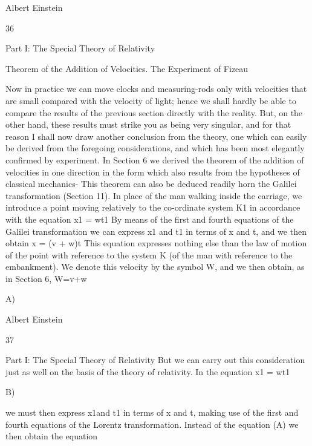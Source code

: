 \documentclass{article}
\begin{document}
Albert Einstein

36

Part I: The Special Theory of Relativity

Theorem of the Addition of
Velocities.
The Experiment of Fizeau

Now in practice we can move clocks and measuring-rods only with velocities that are
small compared with the velocity of light; hence we shall hardly be able to compare the
results of the previous section directly with the reality. But, on the other hand, these results
must strike you as being very singular, and for that reason I shall now draw another
conclusion from the theory, one which can easily be derived from the foregoing
considerations, and which has been most elegantly confirmed by experiment.
In Section 6 we derived the theorem of the addition of velocities in one direction in the
form which also results from the hypotheses of classical mechanics- This theorem can also
be deduced readily horn the Galilei transformation (Section 11). In place of the man
walking inside the carriage, we introduce a point moving relatively to the co-ordinate
system K1 in accordance with the equation
x1 = wt1
By means of the first and fourth equations of the Galilei transformation we can express x1
and t1 in terms of x and t, and we then obtain
x = (v + w)t
This equation expresses nothing else than the law of motion of the point with reference to
the system K (of the man with reference to the embankment). We denote this velocity by
the symbol W, and we then obtain, as in Section 6,
W=v+w

A)

Albert Einstein

37

Part I: The Special Theory of Relativity
But we can carry out this consideration just as well on the basis of the theory of relativity.
In the equation
x1 = wt1

B)

we must then express x1and t1 in terms of x and t, making use of the first and fourth
equations of the Lorentz transformation. Instead of the equation (A) we then obtain the
equation
\end{document}
